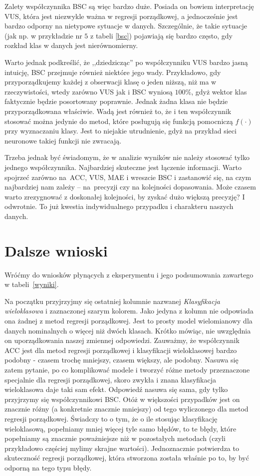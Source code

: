 \documentclass{mini}
\begin{document}
Zalety współczynnika BSC są więc bardzo duże. Posiada on bowiem interpretację VUS, która jest niezwykle ważna w regresji porządkowej, a jednocześnie jest bardzo odporny na nietypowe sytuacje w danych. Szczególnie, że takie sytuacje (jak np. w przykładzie nr $5$ z tabeli \ref{bsc}) pojawiają się bardzo często, gdy rozkład klas w danych jest nierównomierny. 

Warto jednak podkreślić, że ,,dziedzicząc'' po współczynniku VUS bardzo jasną intuicję, BSC przejmuje również niektóre jego wady. Przykładowo, gdy przyporządkujemy każdej z obserwacji klasę o jeden niższą, niż ma w rzeczywistości, wtedy zarówno VUS jak i BSC wyniosą $100\%$, gdyż wektor klas faktycznie będzie posortowany poprawnie. Jednak żadna klasa nie będzie przyporządkowana właściwie. Wadą jest również to, że i ten współczynnik stosować można jedynie do metod, które posługują się funkcją pomocniczą $f(\cdot)$ przy wyznaczaniu klasy. Jest to niejakie utrudnienie, gdyż na przykład sieci neuronowe takiej funkcji nie zwracają.

Trzeba jednak być świadomym, że w analizie wyników nie należy stosować tylko jednego współczynnika. Najbardziej skuteczne jest łączenie informacji. Warto spojrzeć zarówno na~ACC, VUS, MAE i wreszcie BSC i zastanowić się, na czym najbardziej nam zależy -- na~precyzji czy na kolejności dopasowania. Może czasem warto zrezygnować z doskonałej kolejności, by zyskać dużo większą precyzję? I odwrotnie. To już kwestia indywidualnego przypadku i charakteru naszych danych. 

\section{Dalsze wnioski}

Wróćmy do wniosków płynących z eksperymentu i jego podsumowania zawartego w tabeli~\ref{wyniki}.

Na początku przyjrzyjmy się ostatniej kolumnie nazwanej \textit{Klasyfikacja wieloklasowa} i zaznaczonej szarym kolorem. Jako jedyna z kolumn nie odpowiada ona żadnej z metod regresji porządkowej. Jest to prosty model wielomianowy dla danych nominalnych o więcej niż dwóch klasach. Krótko mówiąc, nie uwzględnia on uporządkowania naszej zmiennej odpowiedzi. Zauważmy, że współczynnik ACC jest dla metod regresji porządkowej i klasyfikacji wieloklasowej bardzo podobny - czasem trochę mniejszy, czasem większy, ale podobny. Nasuwa się zatem pytanie, po co komplikować modele i tworzyć różne metody przeznaczone specjalnie dla regresji porządkowej, skoro zwykła i znana klasyfikacja wieloklasowa daje taki sam efekt. Odpowiedź nasuwa się sama, gdy tylko przyjrzymy się współczynnikowi BSC. Otóż w większości  przypadków jest on znacznie różny (a konkretnie znacznie mniejszy) od tego wyliczonego dla metod regresji porządkowej. Świadczy to o tym, że o ile stosując klasyfikację wieloklasową, popełniamy mniej więcej tyle samo błędów, to te błędy, które popełniamy są znacznie poważniejsze niż w pozostałych metodach (czyli przykładowo częściej mylimy skrajne wartości). Jednoznacznie potwierdza to skuteczność regresji porządkowej, która stworzona została właśnie po to, by być odporną na tego typu błędy.
\end{document}

